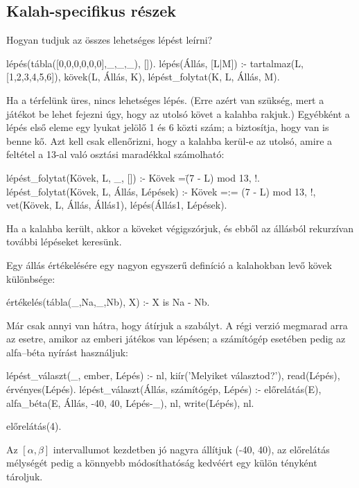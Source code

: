 \subsection*{Kalah-specifikus részek}
Hogyan tudjuk az összes lehetséges lépést leírni?
\begin{program}
lépés(tábla([0,0,0,0,0,0],_,_,_), []).
lépés(Állás, [L|M]) :-
    tartalmaz(L, [1,2,3,4,5,6]),
    kövek(L, Állás, K),
    lépést_folytat(K, L, Állás, M).
\end{program}
Ha a térfelünk üres, nincs lehetséges lépés. (Erre
azért van szükség, mert a játékot be lehet fejezni
úgy, hogy az utolsó követ a kalahba rakjuk.)
Egyébként a lépés első eleme egy lyukat jelölő 1 és
6 közti szám; a  biztosítja, hogy van is
benne kő. Azt kell csak ellenőrizni, hogy a kalahba
kerül-e az utolsó, amire a feltétel a 13-al való
osztási maradékkal számolható:
\begin{program}
lépést_folytat(Kövek, L, _, []) :-
    Kövek =\= (7 - L) mod 13, !.
lépést_folytat(Kövek, L, Állás, Lépések) :-
    Kövek =:= (7 - L) mod 13, !,
    vet(Kövek, L, Állás, Állás1),
    lépés(Állás1, Lépések).
\end{program}
Ha a kalahba került, akkor a köveket végigszórjuk,
és ebből az állásból rekurzívan további lépéseket
keresünk.

Egy állás értékelésére egy nagyon egyszerű definíció
a kalahokban levő kövek különbsége:
\begin{program}
értékelés(tábla(_,Na,_,Nb), X) :- X is Na - Nb.
\end{program}

Már csak annyi van hátra, hogy átírjuk a
 szabályt. A régi verzió
megmarad arra az esetre, amikor az emberi játékos
van lépésen; a számítógép esetében pedig az
alfa--béta nyírást használjuk:
\begin{program}
lépést_választ(_, ember, Lépés) :-
    nl, kiír('Melyiket választod?'),
    read(Lépés), érvényes(Lépés).
lépést_választ(Állás, számítógép, Lépés) :-
    előrelátás(E),
    alfa_béta(E, Állás, -40, 40, Lépés-_),
    nl, write(Lépés), nl.

előrelátás(4).
\end{program}

Az $[\alpha,\beta]$ intervallumot kezdetben jó
nagyra állítjuk (-40, 40), az előrelátás mélységét
pedig a könnyebb módosíthatóság kedvéért egy külön
tényként tároljuk.


